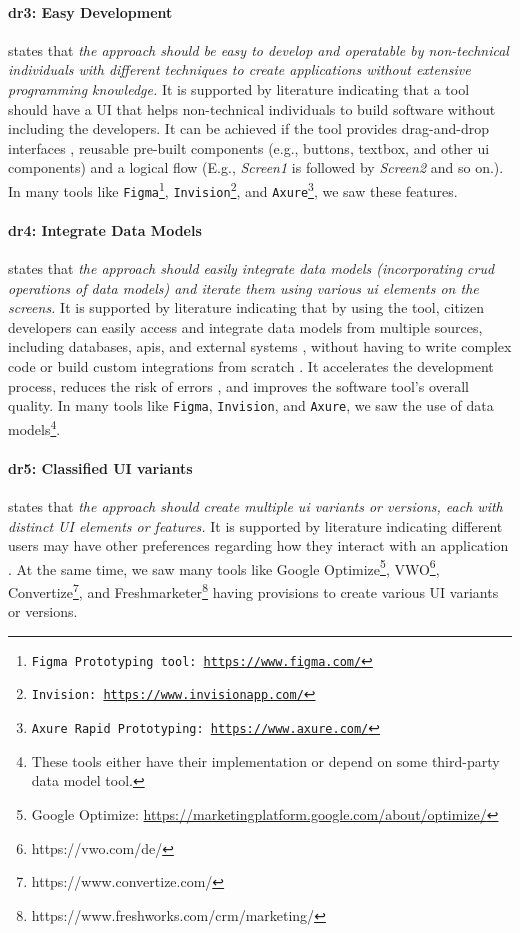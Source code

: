 \paragraph{\ac{dr}3: Easy Development} states that \textit{the approach should be easy to develop and operatable by non-technical individuals with different techniques to create applications without extensive programming knowledge.}
It is supported by literature indicating that a tool should have a UI that helps non-technical individuals to build software without including the developers. 
It can be achieved if the tool provides drag-and-drop interfaces \cite{article:nocode:miller}, reusable pre-built components \cite{article:prototyping:lowcode} (e.g., buttons, textbox, and other \ac{ui} components) and a logical flow (E.g., \textit{Screen1} is followed by \textit{Screen2} and so on.). 
In many tools like \texttt{Figma\footnote{Figma Prototyping tool: \url{https://www.figma.com/}}}, \texttt{Invision\footnote{Invision: \url{https://www.invisionapp.com/}}}, and \texttt{Axure\footnote{Axure Rapid Prototyping: \url{https://www.axure.com/}}}, we saw these features.

\paragraph{\ac{dr}4: Integrate Data Models} states that \textit{the approach should easily integrate data models (incorporating \ac{crud} operations of data models) and iterate them using various \ac{ui} elements on the screens.} 
It is supported by literature indicating that by using the tool, citizen developers can easily access and integrate data models from multiple sources, including databases, \ac{api}s, and external systems \cite{paper:lowcode:khorram}, without having to write complex code or build custom integrations from scratch \cite{article:lowcode:modeldriven}.
It accelerates the development process, reduces the risk of errors \cite{misc:lowcode:platforms}, and improves the software tool's overall quality.
In many tools like \texttt{Figma}, \texttt{Invision}, and \texttt{Axure}, we saw the use of data models\footnote{These tools either have their implementation or depend on some third-party data model tool.}.

\paragraph*{\ac{dr}5: Classified UI variants} states that \textit{the approach should create multiple \ac{ui} variants or versions, each with distinct UI elements or features.}
It is supported by literature indicating different users may have other preferences regarding how they interact with an application \cite{article:swdemand:ahmed}.
At the same time, we saw many tools like Google Optimize\footnote{Google Optimize: \url{https://marketingplatform.google.com/about/optimize/}}, VWO\footnote{https://vwo.com/de/}, Convertize\footnote{https://www.convertize.com/}, and Freshmarketer\footnote{https://www.freshworks.com/crm/marketing/} having provisions to create various UI variants or versions.


